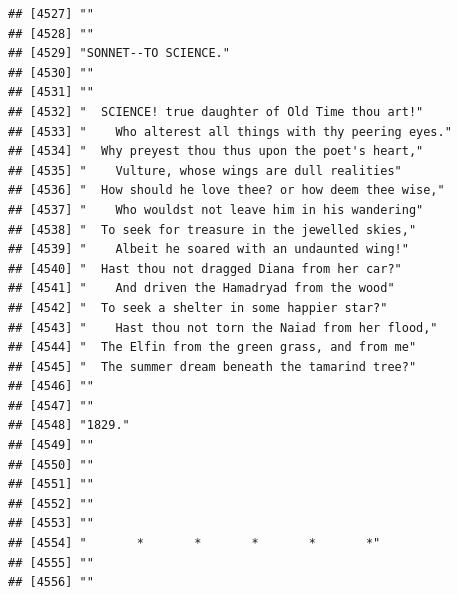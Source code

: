 \documentclass{article}\usepackage[]{graphicx}\usepackage[]{color}
\makeatletter
\newenvironment{kframe}{%
 \def\at@end@of@kframe{}%
 \ifinner\ifhmode%
  \def\at@end@of@kframe{\end{minipage}}%
  \begin{minipage}{\columnwidth}%
 \fi\fi%
 \def\FrameCommand##1{\hskip\@totalleftmargin \hskip-\fboxsep
 \colorbox{shadecolor}{##1}\hskip-\fboxsep
     \hskip-\linewidth \hskip-\@totalleftmargin \hskip\columnwidth}%
 \MakeFramed {\advance\hsize-\width
   \@totalleftmargin\z@ \linewidth\hsize
   \@setminipage}}%
 {\par\unskip\endMakeFramed%
 \at@end@of@kframe}
\newenvironment{knitrout}{}{} %
\makeatother
\begin{document}
\begin{knitrout}
\begin{kframe}
\begin{verbatim}
## [4527] ""                                                                            
## [4528] ""                                                                            
## [4529] "SONNET--TO SCIENCE."                                                         
## [4530] ""                                                                            
## [4531] ""                                                                            
## [4532] "  SCIENCE! true daughter of Old Time thou art!"                              
## [4533] "    Who alterest all things with thy peering eyes."                          
## [4534] "  Why preyest thou thus upon the poet's heart,"                              
## [4535] "    Vulture, whose wings are dull realities"                                 
## [4536] "  How should he love thee? or how deem thee wise,"                           
## [4537] "    Who wouldst not leave him in his wandering"                              
## [4538] "  To seek for treasure in the jewelled skies,"                               
## [4539] "    Albeit he soared with an undaunted wing!"                                
## [4540] "  Hast thou not dragged Diana from her car?"                                 
## [4541] "    And driven the Hamadryad from the wood"                                  
## [4542] "  To seek a shelter in some happier star?"                                   
## [4543] "    Hast thou not torn the Naiad from her flood,"                            
## [4544] "  The Elfin from the green grass, and from me"                               
## [4545] "  The summer dream beneath the tamarind tree?"                               
## [4546] ""                                                                            
## [4547] ""                                                                            
## [4548] "1829."                                                                       
## [4549] ""                                                                            
## [4550] ""                                                                            
## [4551] ""                                                                            
## [4552] ""                                                                            
## [4553] ""                                                                            
## [4554] "       *       *       *       *       *"                                    
## [4555] ""                                                                            
## [4556] ""                                                                            

\end{verbatim}
\end{kframe}
\end{knitrout}
\end{document}

